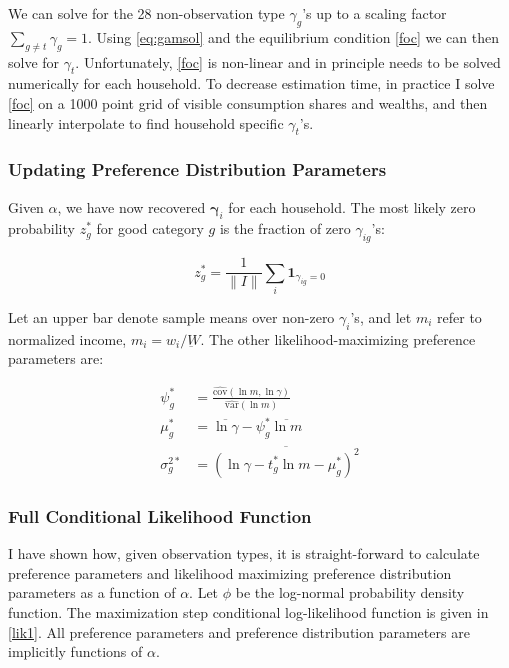 We can solve for the 28 non-observation type $\gamma_g$'s up to a scaling factor $\sum_{g\neq t}\gamma_g = 1$.  Using \eqref{eq:gamsol} and the equilibrium condition \eqref{foc} we can then solve for $\gamma_t$.  Unfortunately, \eqref{foc} is non-linear and in principle needs to be solved numerically for each household.  To decrease estimation time, in practice I solve \eqref{foc} on a 1000 point grid of visible consumption shares and wealths, and then linearly interpolate to find household specific $\gamma_t$'s.

\subsubsection{Updating Preference Distribution Parameters}

Given $\alpha$, we have now recovered $\boldsymbol{\gamma}_i$ for each household.  The most likely zero probability $z_g^*$ for good category $g$ is the fraction of zero $\gamma_{ig}$'s:

\begin{equation}
    z_g^* = \frac{1}{\|I\|} \sum_{i} \mathbf{1}_{\gamma_{ig} = 0} \nonumber
\end{equation}

Let an upper bar denote sample means over non-zero $\gamma_i$'s, and let $m_i$ refer to normalized income, $m_i = w_i/\underbar{W}$.  The other likelihood-maximizing preference parameters are:

\begin{align}
    \psi_g^* &= \frac{\hat{\mbox{cov}}(\ln m, \ln \gamma)}{\hat{\mbox{var}}(\ln m)} \nonumber \\
    \mu_g^* &= \overline{\ln \gamma} - \psi_g^* \overline{\ln m} \nonumber \\
    \sigma_g^{2*} &= \overline{\left(\ln \gamma - t_g^* \ln m - \mu_g^*\right)^2}
\end{align}

\subsubsection{Full Conditional Likelihood Function}

I have shown how, given observation types, it is straight-forward to calculate preference parameters and likelihood maximizing preference distribution parameters as a function of $\alpha$.  Let $\phi$ be the log-normal probability density function.   The maximization step conditional log-likelihood function is given in \eqref{lik1}.  All preference parameters and preference distribution parameters are implicitly functions of $\alpha$.

